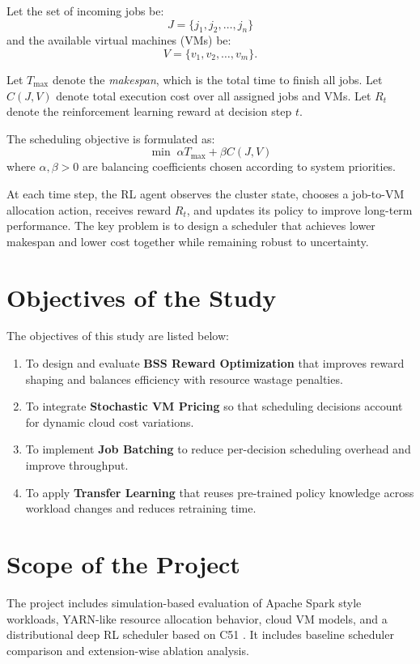 Let the set of incoming jobs be:
\[
J = \{j_1, j_2, \ldots, j_n\}
\]
and the available virtual machines (VMs) be:
\[
V = \{v_1, v_2, \ldots, v_m\}.
\]

Let $T_{\max}$ denote the \emph{makespan}, which is the total time to finish all jobs. Let $C(J,V)$ denote total execution cost over all assigned jobs and VMs. Let $R_t$ denote the reinforcement learning reward at decision step $t$.

The scheduling objective is formulated as:
\[
\min\; \alpha T_{\max} + \beta C(J,V)
\]
where $\alpha, \beta > 0$ are balancing coefficients chosen according to system priorities.

At each time step, the RL agent observes the cluster state, chooses a job-to-VM allocation action, receives reward $R_t$, and updates its policy to improve long-term performance. The key problem is to design a scheduler that achieves lower makespan and lower cost together while remaining robust to uncertainty.

\section{Objectives of the Study}
The objectives of this study are listed below:
\begin{enumerate}
    \item To design and evaluate \textbf{BSS Reward Optimization} that improves reward shaping and balances efficiency with resource wastage penalties.
    \item To integrate \textbf{Stochastic VM Pricing} so that scheduling decisions account for dynamic cloud cost variations.
    \item To implement \textbf{Job Batching} to reduce per-decision scheduling overhead and improve throughput.
    \item To apply \textbf{Transfer Learning} that reuses pre-trained policy knowledge across workload changes and reduces retraining time.
\end{enumerate}

\section{Scope of the Project}
The project includes simulation-based evaluation of Apache Spark style workloads, YARN-like resource allocation behavior, cloud VM models, and a distributional deep RL scheduler based on C51 \cite{bellemare2017distributional}. It includes baseline scheduler comparison and extension-wise ablation analysis.

